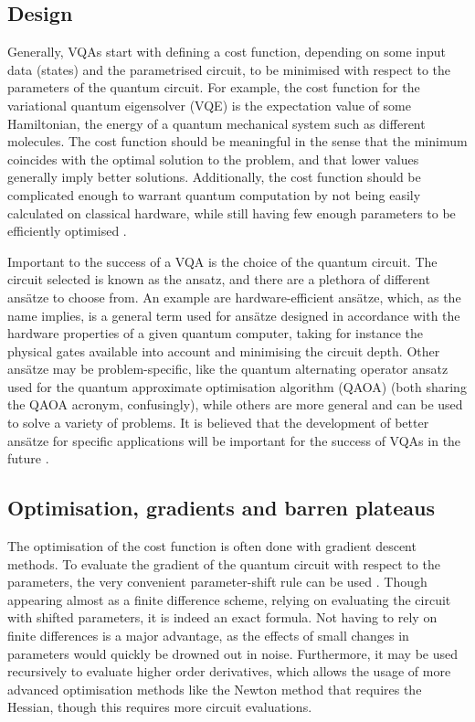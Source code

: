 \subsection{Design}
Generally, VQAs start with defining a cost function, depending on some input data (states) and the parametrised circuit, to be minimised with respect to the parameters of the quantum circuit.
For example, the cost function for the variational quantum eigensolver (VQE) is the expectation value of some Hamiltonian, the energy of a quantum mechanical system such as different molecules.
The cost function should be meaningful in the sense that the minimum coincides with the optimal solution to the problem, and that lower values generally imply better solutions.
Additionally, the cost function should be complicated enough to warrant quantum computation by not being easily calculated on classical hardware, while still having few enough parameters to be efficiently optimised \cite{cerezo2021}.

Important to the success of a VQA is the choice of the quantum circuit.
The circuit selected is known as the ansatz, and there are a plethora of different ansätze to choose from.
An example are hardware-efficient ansätze, which, as the name implies, is a general term used for ansätze designed in accordance with the hardware properties of a given quantum computer, taking for instance the physical gates available into account and minimising the circuit depth.
Other ansätze may be problem-specific, like the quantum alternating operator ansatz used for the quantum approximate optimisation algorithm (QAOA) (both sharing the QAOA acronym, confusingly), while others are more general and can be used to solve a variety of problems.
It is believed that the development of better ansätze for specific applications will be important for the success of VQAs in the future \cite{cerezo2021}.

\subsection{Optimisation, gradients and barren plateaus}
The optimisation of the cost function is often done with gradient descent methods.
To evaluate the gradient of the quantum circuit with respect to the parameters, the very convenient parameter-shift rule can be used \cite{schuld2019}.
Though appearing almost as a finite difference scheme, relying on evaluating the circuit with shifted parameters, it is indeed an exact formula.
Not having to rely on finite differences is a major advantage, as the effects of small changes in parameters would quickly be drowned out in noise.
Furthermore, it may be used recursively to evaluate higher order derivatives, which allows the usage of more advanced optimisation methods like the Newton method that requires the Hessian, though this requires more circuit evaluations.

